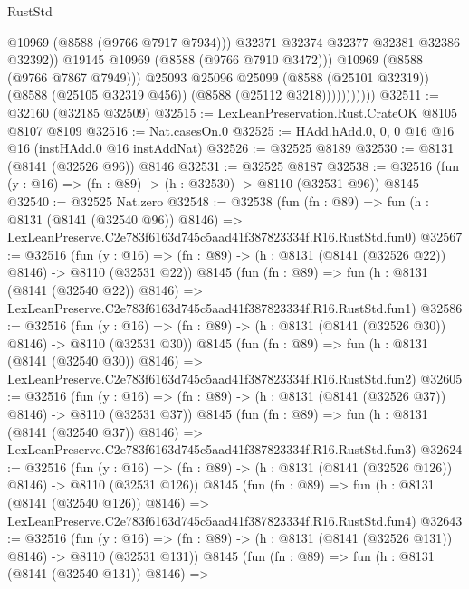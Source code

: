 \begin{lexlean}{RustStd}
\begin{coremodule}
                                @10969
                                (@8588 (@9766 @7917 @7934)))
                              @32371
                              @32374
                              @32377
                              @32381
                              @32386
                              @32392))
                          @19145
                          @10969
                          (@8588 (@9766 @7910 @3472)))
                        @10969
                        (@8588 (@9766 @7867 @7949)))
                      @25093
                      @25096
                      @25099
                      (@8588 (@25101 @32319))
                      (@8588 (@25105 @32319 @456))
                      (@8588 (@25112 @3218)))))))))))
@32511 := @32160 (@32185 @32509)
@32515 := LexLeanPreservation.Rust.CrateOK @8105 @8107 @8109
@32516 := Nat.casesOn.{0}
@32525 := HAdd.hAdd.{0, 0, 0} @16 @16 @16 (instHAdd.{0} @16 instAddNat)
@32526 := @32525 @8189
@32530 := @8131 (@8141 (@32526 @96)) @8146
@32531 := @32525 @8187
@32538 := @32516 (fun (y : @16) => (fn : @89) -> (h : @32530) -> @8110 (@32531 @96)) @8145
@32540 := @32525 Nat.zero
@32548 := @32538
    (fun (fn : @89) =>
    fun (h : @8131 (@8141 (@32540 @96)) @8146) =>
    LexLeanPreserve.C2e783f6163d745c5aad41f387823334f.R16.RustStd.fun0)
@32567 := @32516
    (fun (y : @16) => (fn : @89) -> (h : @8131 (@8141 (@32526 @22)) @8146) -> @8110 (@32531 @22))
    @8145
    (fun (fn : @89) =>
    fun (h : @8131 (@8141 (@32540 @22)) @8146) =>
    LexLeanPreserve.C2e783f6163d745c5aad41f387823334f.R16.RustStd.fun1)
@32586 := @32516
    (fun (y : @16) => (fn : @89) -> (h : @8131 (@8141 (@32526 @30)) @8146) -> @8110 (@32531 @30))
    @8145
    (fun (fn : @89) =>
    fun (h : @8131 (@8141 (@32540 @30)) @8146) =>
    LexLeanPreserve.C2e783f6163d745c5aad41f387823334f.R16.RustStd.fun2)
@32605 := @32516
    (fun (y : @16) => (fn : @89) -> (h : @8131 (@8141 (@32526 @37)) @8146) -> @8110 (@32531 @37))
    @8145
    (fun (fn : @89) =>
    fun (h : @8131 (@8141 (@32540 @37)) @8146) =>
    LexLeanPreserve.C2e783f6163d745c5aad41f387823334f.R16.RustStd.fun3)
@32624 := @32516
    (fun (y : @16) => (fn : @89) -> (h : @8131 (@8141 (@32526 @126)) @8146) -> @8110 (@32531 @126))
    @8145
    (fun (fn : @89) =>
    fun (h : @8131 (@8141 (@32540 @126)) @8146) =>
    LexLeanPreserve.C2e783f6163d745c5aad41f387823334f.R16.RustStd.fun4)
@32643 := @32516
    (fun (y : @16) => (fn : @89) -> (h : @8131 (@8141 (@32526 @131)) @8146) -> @8110 (@32531 @131))
    @8145
    (fun (fn : @89) =>
    fun (h : @8131 (@8141 (@32540 @131)) @8146) =>

\end{coremodule}
\end{lexlean}
